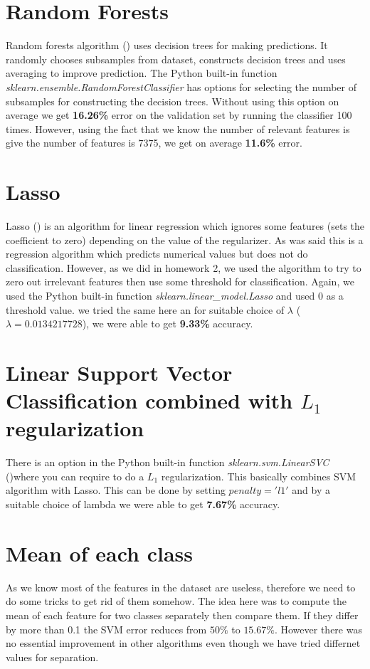 \documentclass{article} %
\begin{document}
\section{Random Forests}
Random forests algorithm (\cite{RandForests}) uses decision trees for making predictions. It randomly 
chooses subsamples from dataset, constructs decision trees and uses averaging to improve prediction. The 
Python built-in function \textit{sklearn.ensemble.RandomForestClassifier} has 
options for selecting the number of subsamples for constructing the decision 
trees. Without using this option on average we get {\bf 16.26\%} error on the validation set 
by running the classifier 100 times. However, using the fact that we know the number of relevant features is 
 give the number of features is 7375, we get  on average {\bf 11.6\%} error.

\section{Lasso}
Lasso (\cite{Lasso}) is an algorithm for linear regression which ignores some features (sets the coefficient to zero) depending
 on the value of the regularizer. As was said this is a regression algorithm which predicts numerical values but 
 does not do classification. However, as we did in homework 2, we used the algorithm to try to zero out
  irrelevant features then use some threshold for  classification. Again, we used the Python built-in 
function \textit{sklearn.linear\_model.Lasso} and used 0 as a threshold value. 
 we tried the same here an for suitable choice of 
$\lambda$  ($ \lambda= 0.0134217728$), we were able to get {\bf 9.33\%} 
accuracy.\\

\section{Linear Support Vector Classification combined with $L_1$ regularization}
There is an option in the Python  built-in function \textit{sklearn.svm.LinearSVC} (\cite{skilearn})where you can 
require to do a $L_1$ regularization. This basically combines SVM algorithm with 
Lasso. This can be done by setting $penalty='l1'$ and by a suitable choice of 
lambda we were able to get {\bf 7.67\%} accuracy.

\section{Mean of each class}
As we know most of the features in the dataset are useless, therefore we need to do some tricks to get rid 
of them somehow. The idea here was to compute the mean of each feature for two classes separately 
then compare them. If they differ by more than 0.1 the SVM error reduces from $50\%$ 
to $15.67\%$. However there was no essential improvement in other algorithms 
even though we have tried differnet values for separation.
\end{document}

